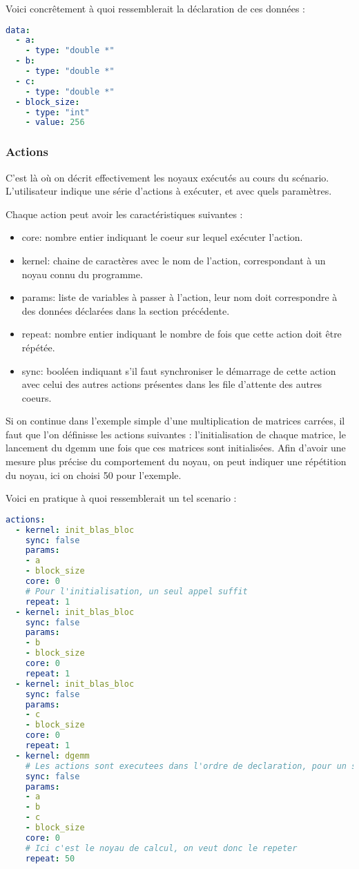 Voici concrêtement à quoi ressemblerait la déclaration de ces données :

\begin{lstlisting}[language=yaml,caption=Exemple de déclaration de variables,label=lst:tool:data-example]
data:
  - a:
    - type: "double *"
  - b:
    - type: "double *"
  - c:
    - type: "double *"
  - block_size:
    - type: "int"
    - value: 256
\end{lstlisting}

\subsubsection{Actions}

C'est là où on décrit effectivement les noyaux exécutés au cours du scénario.
L'utilisateur indique une série d'actions à exécuter, et avec quels paramètres.

Chaque action peut avoir les caractéristiques suivantes :
\begin{itemize}
  \item core: nombre entier indiquant le coeur sur lequel exécuter l'action.
  \item kernel: chaine de caractères avec le nom de l'action, correspondant à un noyau connu du programme.
  \item params: liste de variables à passer à l'action, leur nom doit correspondre à des données déclarées dans la section précédente.
  \item repeat: nombre entier indiquant le nombre de fois que cette action doit être répétée.
  \item sync: booléen indiquant s'il faut synchroniser le démarrage de cette action avec celui des autres actions présentes dans les file d'attente des autres coeurs.
\end{itemize}

Si on continue dans l'exemple simple d'une multiplication de matrices carrées, il faut que l'on définisse les actions suivantes : l'initialisation de chaque matrice, le lancement du dgemm une fois que ces matrices sont initialisées.
Afin d'avoir une mesure plus précise du comportement du noyau, on peut indiquer une répétition du noyau, ici on choisi 50 pour l'exemple.

Voici en pratique à quoi ressemblerait un tel scenario :
\begin{lstlisting}[language=yaml,caption=Exemple de déclaration d'actions,label=lst:tool:actions-example]
actions:
  - kernel: init_blas_bloc
    sync: false
    params: 
    - a
    - block_size
    core: 0
    # Pour l'initialisation, un seul appel suffit
    repeat: 1
  - kernel: init_blas_bloc
    sync: false
    params: 
    - b
    - block_size
    core: 0
    repeat: 1
  - kernel: init_blas_bloc
    sync: false
    params: 
    - c
    - block_size
    core: 0
    repeat: 1
  - kernel: dgemm
    # Les actions sont executees dans l'ordre de declaration, pour un seul dgemm c'est inutile de synchroniser
    sync: false
    params: 
    - a
    - b
    - c
    - block_size
    core: 0
    # Ici c'est le noyau de calcul, on veut donc le repeter
    repeat: 50
\end{lstlisting}

